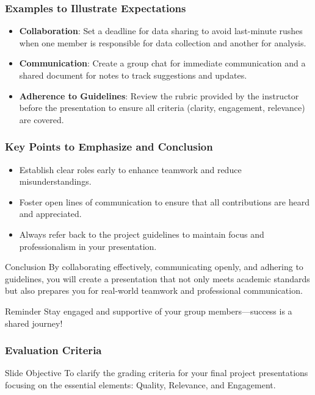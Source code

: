 \documentclass[aspectratio=169]{beamer}
\begin{document}
\begin{frame}[fragile]
    \frametitle{Examples to Illustrate Expectations}
    \begin{itemize}
        \item \textbf{Collaboration}: Set a deadline for data sharing to avoid last-minute rushes when one member is responsible for data collection and another for analysis.
        \item \textbf{Communication}: Create a group chat for immediate communication and a shared document for notes to track suggestions and updates.
        \item \textbf{Adherence to Guidelines}: Review the rubric provided by the instructor before the presentation to ensure all criteria (clarity, engagement, relevance) are covered.
    \end{itemize}
\end{frame}

\begin{frame}[fragile]
    \frametitle{Key Points to Emphasize and Conclusion}
    \begin{itemize}
        \item Establish clear roles early to enhance teamwork and reduce misunderstandings.
        \item Foster open lines of communication to ensure that all contributions are heard and appreciated.
        \item Always refer back to the project guidelines to maintain focus and professionalism in your presentation.
    \end{itemize}
    
    \begin{block}{Conclusion}
        By collaborating effectively, communicating openly, and adhering to guidelines, you will create a presentation that not only meets academic standards but also prepares you for real-world teamwork and professional communication.
    \end{block}

    \begin{block}{Reminder}
        Stay engaged and supportive of your group members—success is a shared journey!
    \end{block}
\end{frame}

\begin{frame}[fragile]
    \frametitle{Evaluation Criteria}
    \begin{block}{Slide Objective}
        To clarify the grading criteria for your final project presentations focusing on the essential elements: Quality, Relevance, and Engagement.
    \end{block}
\end{frame}
\end{document}
